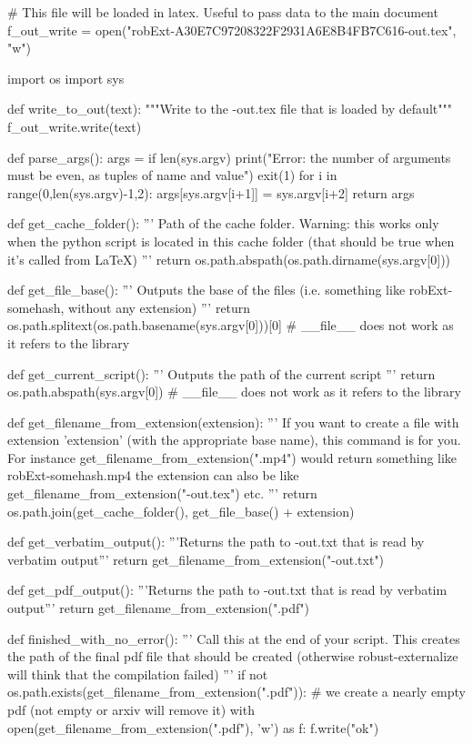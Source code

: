 
# This file will be loaded in latex. Useful to pass data to the main document
f_out_write = open("robExt-A30E7C97208322F2931A6E8B4FB7C616-out.tex", "w")

import os
import sys

def write_to_out(text):
    """Write to the -out.tex file that is loaded by default"""
    f_out_write.write(text)

def parse_args():
    args = {}
    if len(sys.argv) %
        print("Error: the number of arguments must be even, as tuples of name and value")
        exit(1)
    for i in range(0,len(sys.argv)-1,2):
        args[sys.argv[i+1]] = sys.argv[i+2]
    return args

def get_cache_folder():
    '''
    Path of the cache folder. Warning: this works only when the python script
    is located in this cache folder (that should be true when it's called from LaTeX)
    '''
    return os.path.abspath(os.path.dirname(sys.argv[0]))

def get_file_base():
    '''
    Outputs the base of the files (i.e. something like robExt-somehash, without any extension)
    '''
    return os.path.splitext(os.path.basename(sys.argv[0]))[0] # __file__ does not work as it refers to the library

def get_current_script():
    '''
    Outputs the path of the current script
    '''
    return os.path.abspath(sys.argv[0]) # __file__ does not work as it refers to the library


def get_filename_from_extension(extension):
    '''
    If you want to create a file with extension 'extension' (with the appropriate base name), this command
    is for you. For instance get_filename_from_extension(".mp4") would return something like
    robExt-somehash.mp4
    the extension can also be like get_filename_from_extension("-out.tex") etc.
    '''
    return os.path.join(get_cache_folder(), get_file_base() + extension)

def get_verbatim_output():
    '''Returns the path to -out.txt that is read by verbatim output'''
    return get_filename_from_extension("-out.txt")

def get_pdf_output():
    '''Returns the path to -out.txt that is read by verbatim output'''
    return get_filename_from_extension(".pdf")


def finished_with_no_error():
    '''
    Call this at the end of your script. This creates the path of the final pdf file that should be
    created (otherwise robust-externalize will think that the compilation failed)
    '''
    if not os.path.exists(get_filename_from_extension(".pdf")):
        # we create a nearly empty pdf (not empty or arxiv will remove it)
        with open(get_filename_from_extension(".pdf"), 'w') as f:
            f.write("ok")

